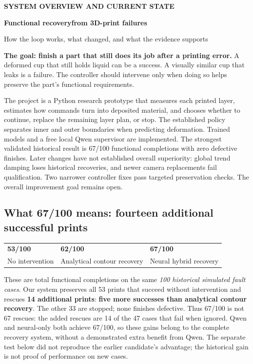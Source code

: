 \documentclass[10pt,letterpaper]{article}
\newcommand{\code}[1]{\texttt{\detokenize{#1}}}
\newcommand{\note}[1]{\begin{tcolorbox}[colback=pale,colframe=teal!55,boxrule=0.5pt,arc=2pt,left=8pt,right=8pt,top=5pt,bottom=5pt]#1\end{tcolorbox}}
\begin{document}
\color{ink}

{\color{teal}\bfseries SYSTEM OVERVIEW AND CURRENT STATE}\par
\vspace{8pt}
{\fontsize{29}{33}\selectfont\bfseries\color{navy}Functional recovery\newline from 3D-print failures}\par
\vspace{5pt}
{\large How the loop works, what changed, and what the evidence supports}\par
\vspace{9pt}

\note{\textbf{The goal: finish a part that still does its job after a printing error.}
A deformed cup that still holds liquid can be a success. A visually similar cup
that leaks is a failure. The controller should intervene only when doing so helps
preserve the part's functional requirements.}

The project is a Python research prototype that measures each printed layer,
estimates how commands turn into deposited material, and chooses whether to
continue, replace the remaining layer plan, or stop. The established \code{contour}
policy separates inner and outer boundaries when predicting deformation. Trained
models and a free local Qwen supervisor are implemented. The strongest validated
historical result is 67/100 functional completions with zero defective finishes.
Later changes have not established overall superiority: global trend damping
loses historical recoveries, and newer camera replacements fail qualification.
Two narrower controller fixes pass targeted preservation checks. The overall
improvement goal remains open.

\subsection*{What 67/100 means: fourteen additional successful prints}
\begin{center}
\begin{tabular*}{\linewidth}{@{\extracolsep{\fill}}lll@{}}
\toprule
{\Large\bfseries 53/100} & {\Large\bfseries 62/100} & {\Large\bfseries\color{teal}67/100}\\
No intervention & Analytical contour recovery & Neural hybrid recovery\\
\bottomrule
\end{tabular*}
\end{center}
These are total functional completions on the same \emph{100 historical simulated
fault cases}. Our system preserves all 53 prints that succeed without intervention
and rescues \textbf{14 additional prints}: \textbf{five more successes than
analytical contour recovery}. The other 33 are stopped; none finishes defective.
Thus 67/100 is not 67 rescues: the added rescues are 14 of the 47 cases that fail
when ignored. Qwen and neural-only both achieve 67/100, so these gains belong to
the complete recovery system, without a demonstrated extra benefit from Qwen.
The separate test below did not reproduce the earlier candidate's advantage;
the historical gain is not proof of performance on new cases.
\end{document}
